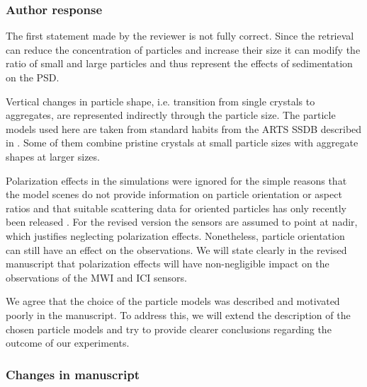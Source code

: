 \subsubsection*{Author response}

The first statement made by the reviewer is not fully correct. Since the retrieval
can reduce the concentration of particles and increase their size it can modify
the ratio of small and large particles and thus represent the effects of sedimentation
on the PSD.

Vertical changes in particle shape, i.e. transition from single crystals to
aggregates, are represented indirectly through the particle size. The particle
models used here are taken from standard habits from the ARTS SSDB described in
\cite{eriksson18}. Some of them combine pristine crystals at small particle
sizes with aggregate shapes at larger sizes.

Polarization effects in the simulations were ignored for the simple reasons that
the model scenes do not provide information on particle orientation or aspect
ratios and that suitable scattering data for oriented particles has only
recently been released \citep{brath19}. For the revised version the sensors are
assumed to point at nadir, which justifies neglecting polarization effects.
Nonetheless, particle orientation can still have an effect on the observations.
We will state clearly in the revised manuscript that polarization effects will
have non-negligible impact on the observations of the MWI and ICI sensors.

We agree that the choice of the particle models was  described and motivated
poorly in the manuscript. To address this, we will extend the description
of the chosen particle models and  try to provide clearer conclusions regarding
the outcome of our experiments.

\subsubsection*{Changes in manuscript}

